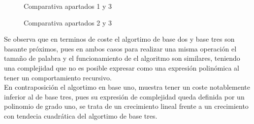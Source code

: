 \begin{figure}[h]
    \centering
    \begin{minipage}[b]{0.45\linewidth}
    \centering
    
    \caption{ Comparativa apartados 1 y 3}
    \end{minipage}
    \hspace{0.5cm}
    \begin{minipage}[b]{0.45\linewidth}
    \centering
    
    \caption{ Comparativa apartados 2 y 3}
    \end{minipage}
\end{figure}

Se observa que en terminos de coste el algortimo de base dos y base tres son basante próximos, pues en ambos casos para realizar una misma operación el tamaño de palabra y el funcionamiento de el algoritmo son similares, teniendo una complejidad que no es posible expresar como una expresión polinómica al tener un comportamiento recursivo.\\

En contraposición el algortimo en base uno, muestra tener un coste notablemente inferior al de base tres, pues su expresión de complejidad queda definida por un polinomio de grado uno, se trata de un crecimiento lineal frente a un crecimiento con tendecia cuadrática del algortimo de base tres.